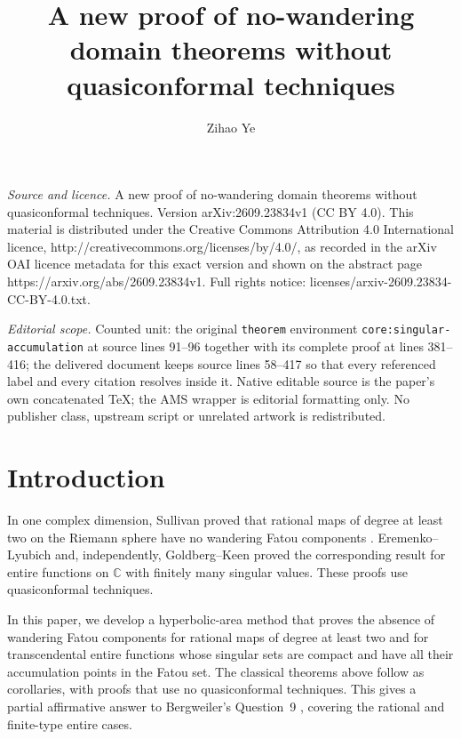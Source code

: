 \documentclass[10pt,a4paper]{amsart}
\newcommand{\C}{\mathbb C}
\numberwithin{equation}{section}
\begin{document}
\title[A new proof of no-wandering domain theorems without quasicon]{A new proof of no-wandering domain theorems without quasiconformal techniques}
\author{Zihao Ye}
\date{}
\maketitle
\noindent\emph{Source and licence.} A new proof of no-wandering domain theorems without quasiconformal techniques. Version arXiv:2609.23834v1 (CC BY 4.0). This material is distributed under the Creative Commons Attribution 4.0 International licence, http://creativecommons.org/licenses/by/4.0/, as recorded in the arXiv OAI licence metadata for this exact version and shown on the abstract page https://arxiv.org/abs/2609.23834v1. Full rights notice: licenses/arxiv-2609.23834-CC-BY-4.0.txt.\par\smallskip
\noindent\textit{Editorial scope.} Counted unit: the original \texttt{theorem} environment \texttt{core:singular-accumulation} at source lines 91--96 together with its complete proof at lines 381--416; the delivered document keeps source lines 58--417 so that every referenced label and every citation resolves inside it. Native editable source is the paper's own concatenated TeX; the AMS wrapper is editorial formatting only. No publisher class, upstream script or unrelated artwork is redistributed.
\section{Introduction}

In one complex dimension, Sullivan proved that rational maps of degree
at least two on the Riemann sphere have no wandering Fatou components
\cite{Sullivan}. Eremenko--Lyubich \cite[Theorem~3]{EL} and,
independently, Goldberg--Keen \cite[Theorem~4.2]{GoldbergKeen} proved
the corresponding result for entire functions on $\C$ with finitely many
singular values.
These proofs use quasiconformal techniques.

In this paper, we develop a hyperbolic-area method that proves the
absence of wandering Fatou components for rational maps of degree at
least two and for transcendental entire functions whose singular sets
are compact and have all their accumulation points in the Fatou set.
The classical theorems above follow as corollaries, with proofs that
use no quasiconformal techniques. This gives a partial affirmative
answer to Bergweiler's Question~9 \cite[Section~4.6]{Bergweiler},
covering the rational and finite-type entire cases.
\end{document}
